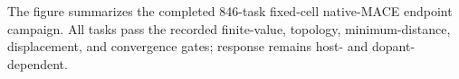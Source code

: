 The figure summarizes the completed 846-task fixed-cell native-MACE endpoint campaign. All tasks pass the recorded finite-value, topology, minimum-distance, displacement, and convergence gates; response remains host- and dopant-dependent.
